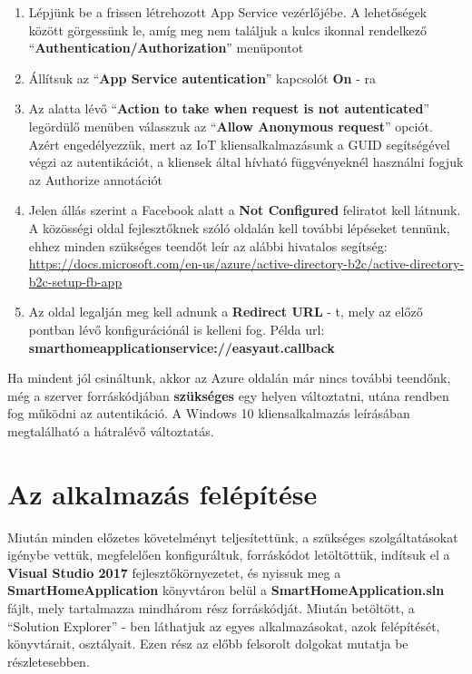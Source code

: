 \documentclass[a4paper,12pt]{report}
\begin{document}
    \begin{enumerate}
        \item Lépjünk be a frissen létrehozott App Service vezérlőjébe. A lehetőségek között görgessünk le, amíg meg nem találjuk
        a kulcs ikonnal rendelkező \\ ``\textbf{Authentication/Authorization}'' menüpontot
        \item Állítsuk az ``\textbf{App Service autentication}'' kapcsolót \textbf{On} - ra
        \item Az alatta lévő ``\textbf{Action to take when request is not autenticated}'' legördülő menüben válasszuk az
        ``\textbf{Allow Anonymous request}'' opciót. Azért engedélyezzük, mert az IoT kliensalkalmazásunk a GUID segítségével
        végzi az autentikációt, a kliensek által hívható függvényeknél használni fogjuk az Authorize annotációt
        \item Jelen állás szerint a Facebook alatt a \textbf{Not Configured} feliratot kell látnunk. A közösségi oldal fejlesztőknek
        szóló oldalán kell további lépéseket tennünk, ehhez minden szükséges teendőt leír az alábbi hivatalos segítség:
        \url{https://docs.microsoft.com/en-us/azure/active-directory-b2c/active-directory-b2c-setup-fb-app}
        \item Az oldal legalján meg kell adnunk a \textbf{Redirect URL} - t, mely az előző pontban lévő konfigurációnál is kelleni fog.
        Példa url: \textbf{smarthomeapplicationservice://easyaut.callback}
    \end{enumerate}

    Ha mindent jól csináltunk, akkor az Azure oldalán már nincs további teendőnk, még a szerver forráskódjában \textbf{szükséges}
    egy helyen változtatni, utána rendben fog működni az autentikáció. A Windows 10 kliensalkalmazás leírásában megtalálható a hátralévő változtatás.

    \section{Az alkalmazás felépítése}
    Miután minden előzetes követelményt teljesítettünk, a szükséges szolgáltatásokat igénybe vettük, megfelelően konfiguráltuk,
    forráskódot letöltöttük, indítsuk el a \textbf{Visual Studio 2017} fejlesztőkörnyezetet, és nyissuk meg a \textbf{SmartHomeApplication}
    könyvtáron belül a \textbf{SmartHomeApplication.sln} fájlt, mely tartalmazza mindhárom rész forráskódját. Miután betöltött, a ``Solution Explorer'' - ben
    láthatjuk az egyes alkalmazásokat, azok felépítését, könyvtárait, osztályait. Ezen rész az előbb felsorolt dolgokat mutatja be
    részletesebben.
\end{document}
